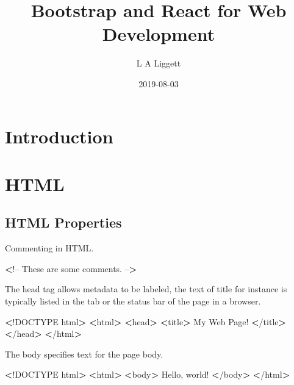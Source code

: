 \documentclass[]{book}
\title{Bootstrap and React for Web Development}
\author{L A Liggett}
\date{2019-08-03}
\newenvironment{Shaded}{\begin{snugshade}}{\end{snugshade}}
\newcommand{\FunctionTok}[1]{\textcolor[rgb]{0.00,0.00,0.00}{#1}}
\newcommand{\OperatorTok}[1]{\textcolor[rgb]{0.81,0.36,0.00}{\textbf{#1}}}
\newcommand{\ExtensionTok}[1]{#1}
\newcommand{\NormalTok}[1]{#1}
\begin{document}
\maketitle

{
\setcounter{tocdepth}{1}
\tableofcontents
}
\chapter{Introduction}\label{introduction}

\chapter{HTML}\label{html}

\section{HTML Properties}\label{html-properties}

Commenting in HTML.

\begin{Shaded}
\begin{Highlighting}[]
\OperatorTok{<}\NormalTok{!}\ExtensionTok{--}
\ExtensionTok{These}\NormalTok{ are some comments.}
\ExtensionTok{--}\OperatorTok{>}
\end{Highlighting}
\end{Shaded}

The head tag allows metadata to be labeled, the text of title for
instance is typically listed in the tab or the status bar of the page in
a browser.

\begin{Shaded}
\begin{Highlighting}[]
\OperatorTok{<}\NormalTok{!}\ExtensionTok{DOCTYPE}\NormalTok{ html}\OperatorTok{>}         
\OperatorTok{<}\ExtensionTok{html}\OperatorTok{>}                  
    \OperatorTok{<}\FunctionTok{head}\OperatorTok{>}              
        \OperatorTok{<}\ExtensionTok{title}\OperatorTok{>}         
            \ExtensionTok{My}\NormalTok{ Web Page!}
        \OperatorTok{<}\NormalTok{/}\ExtensionTok{title}\OperatorTok{>}        
    \OperatorTok{<}\NormalTok{/}\ExtensionTok{head}\OperatorTok{>}             
\OperatorTok{<}\NormalTok{/}\ExtensionTok{html}\OperatorTok{>}                 
\end{Highlighting}
\end{Shaded}

The body specifies text for the page body.

\begin{Shaded}
\begin{Highlighting}[]
\OperatorTok{<}\NormalTok{!}\ExtensionTok{DOCTYPE}\NormalTok{ html}\OperatorTok{>}         
\OperatorTok{<}\ExtensionTok{html}\OperatorTok{>}                  
    \OperatorTok{<}\ExtensionTok{body}\OperatorTok{>}              
        \ExtensionTok{Hello}\NormalTok{, world!   }
    \OperatorTok{<}\NormalTok{/}\ExtensionTok{body}\OperatorTok{>}             
\OperatorTok{<}\NormalTok{/}\ExtensionTok{html}\OperatorTok{>}                 
\end{Highlighting}
\end{Shaded}
\end{document}
